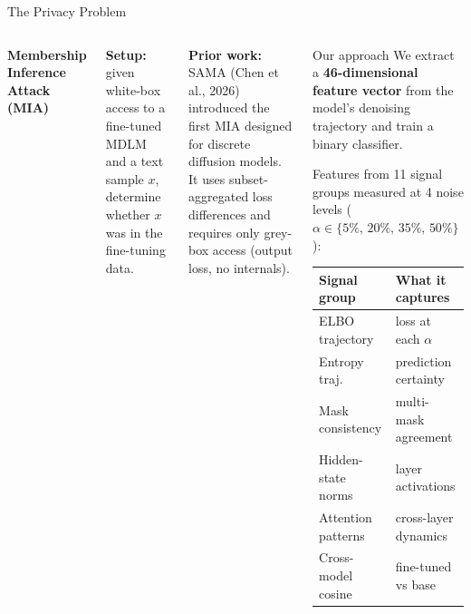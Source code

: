 \documentclass[aspectratio=169,10pt]{beamer}
\begin{document}
\begin{frame}{The Privacy Problem}

\begin{columns}[T]

  \textbf{Membership Inference Attack (MIA)}

  \medskip
  \textbf{Setup:} given white-box access to a fine-tuned MDLM and a text
  sample $x$, determine whether $x$ was in the fine-tuning data.

  \medskip
  \textbf{Prior work:} SAMA (Chen et al., 2026) introduced the first MIA
  designed for discrete diffusion models. It uses subset-aggregated loss
  differences and requires only grey-box access (output loss, no internals).

  \begin{block}{Our approach}
    We extract a \textbf{46-dimensional feature vector} from the model's
    denoising trajectory and train a binary classifier.

    \medskip
    Features from 11 signal groups measured at 4 noise levels
    ($\alpha \in \{5\%,\,20\%,\,35\%,\,50\%\}$):

    \medskip
    {\footnotesize
    \begin{tabular}{@{}ll@{}}
      \toprule
      Signal group & What it captures \\
      \midrule
      ELBO trajectory   & loss at each $\alpha$ \\
      Entropy traj.     & prediction certainty \\
      Mask consistency  & multi-mask agreement \\
      Hidden-state norms & layer activations \\
      Attention patterns & cross-layer dynamics \\
      Cross-model cosine & fine-tuned vs base \\
      \bottomrule
    \end{tabular}
    }
  \end{block}
\end{columns}

\end{frame}
\end{document}
